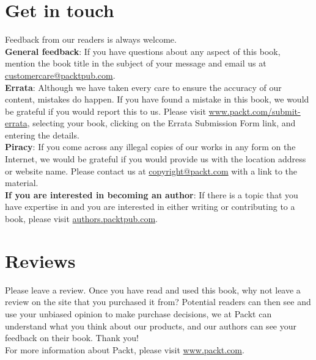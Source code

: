 \begin{FlushLeft}
\section*{Get in touch}
Feedback from our readers is always welcome.\\ 


\textbf{General feedback}: If you have questions about any aspect of this book, mention the book title in the subject of your message and email us at \href{mailto:customercare@packtpub.com}{customercare@packtpub.com}.\\

\textbf{Errata}: Although we have taken every care to ensure the accuracy of our content, mistakes do happen. If you have found a mistake in this book, we would be grateful if you would report this to us. Please visit \url{www.packt.com/submit-errata}, selecting your book, clicking on the Errata Submission Form link, and entering the details.\\
 

\textbf{Piracy}: If you come across any illegal copies of our works in any form on the Internet, we would be grateful if you would provide us with the location address or website name. Please contact us at \href{mailto:copyright@packt.com}{copyright@packt.com} with a link to the material.\\
 
\textbf{If you are interested in becoming an author}: If there is a topic that you have expertise in and you are interested in either writing or contributing to a book, please visit \url{authors.packtpub.com}.\\

\section*{Reviews}
Please leave a review. Once you have read and used this book, why not leave a review on the site that you purchased it from? Potential readers can then see and use your unbiased opinion to make purchase decisions, we at Packt can understand what you think about our products, and our authors can see your feedback on their
book. Thank you!\\

For more information about Packt, please visit \url{www.packt.com}.

\end{FlushLeft}

\clearpage
